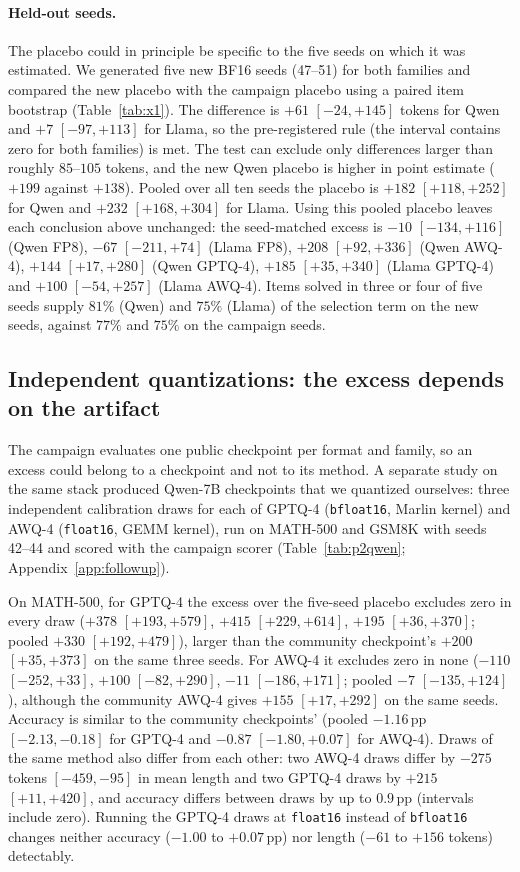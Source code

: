 \documentclass[11pt,a4paper]{article}
\begin{document}
\paragraph{Held-out seeds.} The placebo could in principle be specific to the five seeds on which it was estimated. We generated five new BF16 seeds (47--51) for both families and compared the new placebo with the campaign placebo using a paired item bootstrap (Table~\ref{tab:x1}). The difference is $+61$ $[-24,+145]$ tokens for Qwen and $+7$ $[-97,+113]$ for Llama, so the pre-registered rule (the interval contains zero for both families) is met. The test can exclude only differences larger than roughly $85$--$105$ tokens, and the new Qwen placebo is higher in point estimate ($+199$ against $+138$). Pooled over all ten seeds the placebo is $+182$ $[+118,+252]$ for Qwen and $+232$ $[+168,+304]$ for Llama. Using this pooled placebo leaves each conclusion above unchanged: the seed-matched excess is $-10$ $[-134,+116]$ (Qwen FP8), $-67$ $[-211,+74]$ (Llama FP8), $+208$ $[+92,+336]$ (Qwen AWQ-4), $+144$ $[+17,+280]$ (Qwen GPTQ-4), $+185$ $[+35,+340]$ (Llama GPTQ-4) and $+100$ $[-54,+257]$ (Llama AWQ-4). Items solved in three or four of five seeds supply $81\%$ (Qwen) and $75\%$ (Llama) of the selection term on the new seeds, against $77\%$ and $75\%$ on the campaign seeds.





\subsection{Independent quantizations: the excess depends on the artifact}
\label{sec:artifacts}
The campaign evaluates one public checkpoint per format and family, so an excess could belong to a checkpoint and not to its method. A separate study on the same stack produced Qwen-7B checkpoints that we quantized ourselves: three independent calibration draws for each of GPTQ-4 (\texttt{bfloat16}, Marlin kernel) and AWQ-4 (\texttt{float16}, GEMM kernel), run on MATH-500 and GSM8K with seeds 42--44 and scored with the campaign scorer (Table~\ref{tab:p2qwen}; Appendix~\ref{app:followup}).

On MATH-500, for GPTQ-4 the excess over the five-seed placebo excludes zero in every draw ($+378$ $[+193,+579]$, $+415$ $[+229,+614]$, $+195$ $[+36,+370]$; pooled $+330$ $[+192,+479]$), larger than the community checkpoint's $+200$ $[+35,+373]$ on the same three seeds. For AWQ-4 it excludes zero in none ($-110$ $[-252,+33]$, $+100$ $[-82,+290]$, $-11$ $[-186,+171]$; pooled $-7$ $[-135,+124]$), although the community AWQ-4 gives $+155$ $[+17,+292]$ on the same seeds. Accuracy is similar to the community checkpoints' (pooled $-1.16$\,pp $[-2.13,-0.18]$ for GPTQ-4 and $-0.87$ $[-1.80,+0.07]$ for AWQ-4). Draws of the same method also differ from each other: two AWQ-4 draws differ by $-275$ tokens $[-459,-95]$ in mean length and two GPTQ-4 draws by $+215$ $[+11,+420]$, and accuracy differs between draws by up to $0.9$\,pp (intervals include zero). Running the GPTQ-4 draws at \texttt{float16} instead of \texttt{bfloat16} changes neither accuracy ($-1.00$ to $+0.07$\,pp) nor length ($-61$ to $+156$ tokens) detectably.
\end{document}
